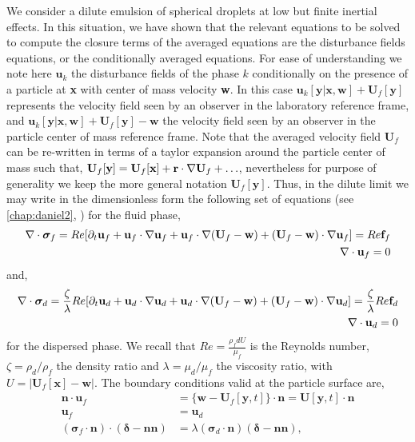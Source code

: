 We consider a dilute emulsion of spherical droplets at low but finite inertial effects. 
In this situation, we have shown that the relevant equations to be solved to compute the closure terms of the averaged equations are the disturbance fields equations, or the conditionally averaged equations. 
For ease of understanding we note here $\textbf{u}_k$ the disturbance fields of the phase $k$ conditionally on the presence of a particle at \textbf{x} with center of mass velocity \textbf{w}.
In this case $\textbf{u}_k[\textbf{y}|\textbf{x},\textbf{w}] + \textbf{U}_f[\textbf{y}]$ represents the velocity field seen by an observer in the laboratory reference frame, and $\textbf{u}_k[\textbf{y}|\textbf{x},\textbf{w}] + \textbf{U}_f[\textbf{y}] - \textbf{w}$ the velocity field seen by an observer in the particle center of mass reference frame.
Note that the averaged velocity field $\textbf{U}_f$ can be re-written in terms of a taylor expansion around the particle center of mass such that, $\textbf{U}_f[\textbf{y}] = \textbf{U}_f[\textbf{x}] + \textbf{r} \cdot \mathbf{\nabla} \textbf{U}_f + \ldots$, nevertheless for purpose of generality we keep the more general notation $\textbf{U}_f[\textbf{y}]$. 
Thus, in the dilute limit we may write in the dimensionless form the following set of equations (see \ref{chap:daniel2}, \citep{stone2001inertial}) for the fluid phase, 
\begin{align*}
    \mathbf{\nabla}\cdot\bm\sigma_f
    = 
    Re [
    \partial_t \textbf{u}_f
    + \textbf{u}_f\cdot \mathbf{\nabla} \textbf{u}_f
    + \textbf{u}_f\cdot \mathbf{\nabla} (\textbf{U}_f - \textbf{w})
    + (\textbf{U}_f - \textbf{w})\cdot \mathbf{\nabla} \textbf{u}_f]
    = Re \textbf{f}_f\\
    \mathbf{\nabla}\cdot \textbf{u}_f = 0
\end{align*}
and, 
\begin{align*}
    \mathbf{\nabla}\cdot\bm\sigma_d
    = 
    \frac{\zeta}{\lambda}Re [
    \partial_t \textbf{u}_d
    + \textbf{u}_d\cdot \mathbf{\nabla} \textbf{u}_d
    + \textbf{u}_d\cdot \mathbf{\nabla} (\textbf{U}_f - \textbf{w})
    + (\textbf{U}_f - \textbf{w})\cdot \mathbf{\nabla} \textbf{u}_d]
    = \frac{\zeta}{\lambda}Re \textbf{f}_d\\
    \mathbf{\nabla}\cdot \textbf{u}_d = 0
\end{align*}
for the dispersed phase. 
We recall that $Re = \frac{\rho_f d U}{\mu_f}$ is the Reynolds number, $\zeta = \rho_d / \rho_f$ the density ratio and $\lambda = \mu_d / \mu_f$ the viscosity ratio, with $U = |\textbf{U}_f[\textbf{x}] - \textbf{w}|$. 
The boundary conditions valid at the particle surface are, 
\begin{align}
    \textbf{n}\cdot\textbf{u}_f
    &= \{\textbf{w} - \textbf{U}_f[\textbf{y},t]\}\cdot \textbf{n} 
    = \textbf{U}[\textbf{y},t]\cdot \textbf{n} \\
    \textbf{u}_f &= \textbf{u}_d\\
    (\bm\sigma_f\cdot\textbf{n})\cdot (\bm\delta - \textbf{nn})
    &= \lambda (\bm\sigma_d\cdot \textbf{n})(\bm\delta - \textbf{nn}),
    \label{eq:bc_stress_orig}
\end{align}
